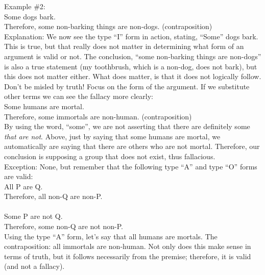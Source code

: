 \documentclass[a4paper,12pt,single,pdftex]{scrartcl}
\begin{document}
    
      Example \#2:
    \\

    
      Some dogs bark.
    \\

    
      Therefore, some non-barking things are non-dogs. (contraposition)
    \\

    
      Explanation: We now see the type “I” form in action, stating, “Some” dogs bark.  This is true, but that really does not matter in determining what form of an argument is valid or not.  The conclusion, “some non-barking things are non-dogs” is also a true statement (my toothbrush, which is a non-dog, does not bark), but this does not matter either.  What does matter, is that it does not logically follow.  Don’t be misled by truth!  Focus on the form of the argument.  If we substitute other terms we can see the fallacy more clearly:
    \\

    
      Some humans are mortal.
    \\

    
      Therefore, some immortals are non-human. (contraposition)
    \\

    
      By using the word, “some”, we are not asserting that there are definitely some {\it that are not}.  Above, just by saying that some humans are mortal, we automatically are saying that there are others who are not mortal.  Therefore, our conclusion is supposing a group that does not exist, thus fallacious.
    \\

    
      Exception: None, but remember that the following type “A” and type “O” forms are valid:
    \\

    
      All P are Q.
    \\

    
      Therefore, all non-Q are non-P.
    \\

    
       
    \\

    
      Some P are not Q.
    \\

    
      Therefore, some non-Q are not non-P.
    \\

    
      Using the type “A” form, let’s say that all humans are mortals.  The contraposition: all immortals are non-human.  Not only does this make sense in terms of truth, but it follows necessarily from the premise; therefore, it is valid (and not a fallacy).
    \\
\end{document}
